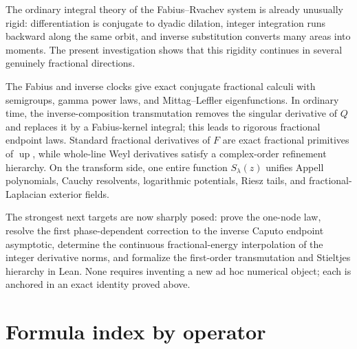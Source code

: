 \documentclass[11pt,oneside]{article}
\theoremstyle{definition}
\theoremstyle{remark}
\newcommand{\Up}{\operatorname{up}}
\newcommand{\1}{\mathbf 1}
\begin{document}
The ordinary integral theory of the Fabius--Rvachev system is already unusually
rigid: differentiation is conjugate to dyadic dilation, integer integration
runs backward along the same orbit, and inverse substitution converts many
areas into moments.  The present investigation shows that this rigidity
continues in several genuinely fractional directions.

The Fabius and inverse clocks give exact conjugate fractional calculi with
semigroups, gamma power laws, and Mittag--Leffler eigenfunctions.  In ordinary
time, the inverse-composition transmutation removes the singular derivative of
$Q$ and replaces it by a Fabius-kernel integral; this leads to rigorous
fractional endpoint laws.  Standard fractional derivatives of $F$ are exact
fractional primitives of $\Up$, while whole-line Weyl derivatives satisfy a
complex-order refinement hierarchy.  On the transform side, one entire
function $S_\lambda(z)$ unifies Appell polynomials, Cauchy resolvents, logarithmic
potentials, Riesz tails, and fractional-Laplacian exterior fields.

The strongest next targets are now sharply posed: prove the one-node law,
resolve the first phase-dependent correction to the inverse Caputo endpoint
asymptotic, determine the continuous fractional-energy interpolation of the
integer derivative norms, and formalize the first-order transmutation and
Stieltjes hierarchy in Lean.  None requires inventing a new ad hoc numerical
object; each is anchored in an exact identity proved above.

\appendix

\section{Formula index by operator}
\end{document}
